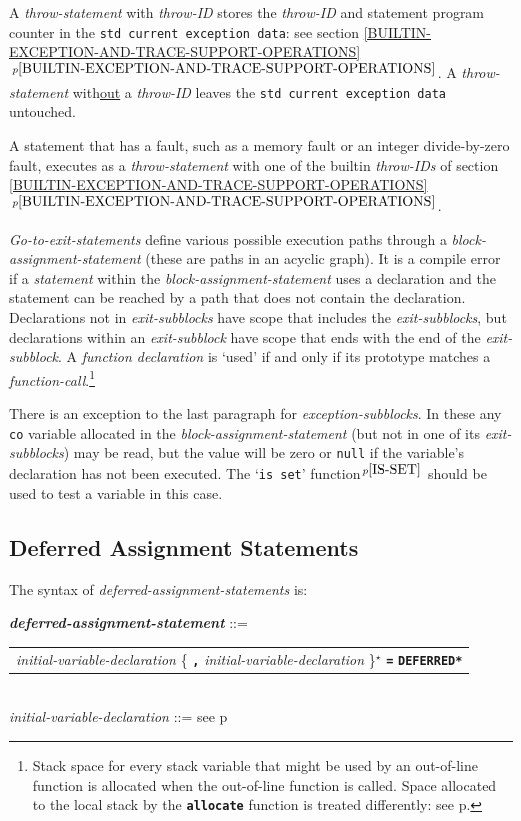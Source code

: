 \documentclass[12pt]{article}
\newcommand{\TT}[1]{{\tt \bfseries #1}}
\newcommand{\STAR}{{\Large $^\star$}}
\newcommand{\ttkey}[1]{{\tt \bfseries #1}}
\newcommand{\emkey}[1]{{\em \bfseries #1}}
\newcommand{\itemref}[1]{\ref{#1}$\,^{p\pageref{#1}}$}
\newcommand{\pagref}[1]{p\pageref{#1}}
\newcommand{\pagnote}[1]{$\,^{p\pageref{#1}}$}
\newenvironment{indpar}[1][0.3in]%
	{\begin{list}{}%
		     {\setlength{\itemsep}{0in}%
		      \setlength{\topsep}{0in}%
		      \setlength{\parsep}{1ex}%
		      \setlength{\labelwidth}{#1}%
		      \setlength{\leftmargin}{#1}%
		      \addtolength{\leftmargin}{\labelsep}}%
	 \item}%
	{\end{list}}
\begin{document}
A {\em throw-statement} with {\em throw-ID} stores the {\em throw-ID}
and statement program counter in the {\tt std current exception data}:
see section \itemref{BUILTIN-EXCEPTION-AND-TRACE-SUPPORT-OPERATIONS}.
A {\em throw-statement} with\underline{out} a {\em throw-ID}
leaves the {\tt std current exception data} untouched.

A statement that has a fault,
such as a memory fault or an integer divide-by-zero fault,
executes as a {\em throw-statement} with one of the builtin {\em throw-IDs}
of section \itemref{BUILTIN-EXCEPTION-AND-TRACE-SUPPORT-OPERATIONS}.

{\em Go-to-exit-statements} define various possible execution
paths through a {\em block-assignment-statement}
(these are paths in an acyclic graph).
It is a compile error if a {\em statement}
within the {\em block-assignment-statement}
uses a declaration and the statement can be reached by a path that
does not contain the declaration.
Declarations not in {\em exit-subblocks} have scope
that includes the {\em exit-subblocks}, but declarations
within an {\em exit-subblock} have scope that ends with the end of
the {\em exit-subblock}.  A {\em function declaration}
is `used' if and only if its
prototype matches a {\em function-call}.\footnote{Stack space for every
stack variable that might be used by an out-of-line function is
allocated when the out-of-line function is called.  Space allocated
to the local stack
by the \TT{allocate} function is treated differently:  see
\pagref{OUT-OF-LINE-LOCALS}.}

There is an exception to the last paragraph for {\em exception-subblocks}.
In these any {\tt co} variable allocated in the
{\em block-assignment-statement} (but not in one of its {\em exit-subblocks})
may be read, but the value will
be zero or {\tt null} if the variable's declaration has not been
executed.  The `{\tt is set}' function\pagnote{IS-SET} should be
used to test a variable in this case.

\subsection{Deferred Assignment Statements}
\label{DEFERRED-ASSIGNMENT-STATEMENTS}

The syntax of {\em defer\-red-assignment-state\-ments} is:

\begin{indpar}
\emkey{deferred-assignment-statement} ::= \\
\hspace*{0.3in}
    \begin{tabular}[t]{@{}l}
        {\em initial-variable-declaration}
                \{ \TT{,} {\em initial-variable-declaration} \}\STAR{}
		     \TT{=} \ttkey{*DEFERRED*} \\
    \end{tabular}
\\[0.5ex]
{\em initial-variable-declaration} ::=
    see \pagref{INITIAL-VARIABLE-DECLARATION}
\end{indpar}
\end{document}
